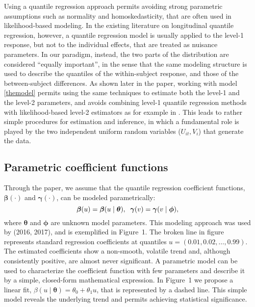 \documentclass[12pt]{article}
\def\thetavec{\bm{\theta}}
\def\phivec{\bm{\phi}}
\def\betavec{\bm{\beta}}
\def\gammavec{\bm{\gamma}}
\begin{document}
Using a quantile regression approach permits avoiding strong parametric assumptions such as normality and homoskedasticity,
that are often used in likelihood-based modeling. In the existing literature on longitudinal quantile regression, however,  
a quantile regression model is usually applied to the level-1 response, but not to the individual effects, that are treated as nuisance parameters.
In our paradigm, instead, the two parts of the distribution are considered ``equally important'',
in the sense that the same modeling structure is used to describe 
the quantiles of the within-subject response, and those of the between-subject differences.
As shown later in the paper, working with model \eqref{themodel} permits using the same techniques to estimate both the level-1 and the level-2 parameters,
and avoids combining level-1 quantile regression methods with likelihood-based level-2 estimators as for example in \cite{kim}.
This leads to rather simple procedures for estimation and inference, in which a fundamental role is played by the two independent uniform random variables 
($U_{it}, V_i$) that generate the data.





\subsection{Parametric coefficient functions}
Through the paper, we assume that
the quantile regression coefficient functions, $\betavec(\cdot)$ and $\gammavec(\cdot)$,
can be modeled parametrically:
\begin{equation}\label{par}
  \betavec(u) = \betavec(u\mid\thetavec), \hspace{0.2cm}
  \gammavec(v) = \gammavec(v\mid\phivec),
\end{equation}
where $\thetavec$ and $\phivec$ are unknown  model parameters. 
This modeling approach was used by \citeauthor{iqr} (2016, 2017),
and is exemplified in Figure~1. The broken line in figure 
represents standard regression coefficients at quantiles $u = (0.01,0.02, \ldots, 0.99)$. 
The estimated coefficients show a non-smooth, volatile trend and, 
although consistently positive, are almost never significant. A parametric model 
can be used to characterize the coefficient function with few parameters and describe it by a simple,
closed-form mathematical expression. In Figure~1 we propose a linear fit, 
$\beta(u \mid \thetavec) = \theta_0 + \theta_1 u$, that is represented by a dashed line.
This simple model reveals the underlying trend and permits achieving statistical significance.
\end{document}
